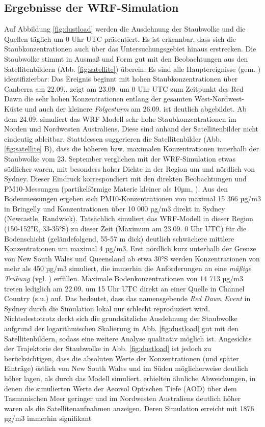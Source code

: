 \documentclass[12pt,a4paper,onecolumn]{scrartcl}
\begin{document}
\subsection{Ergebnisse der WRF-Simulation} \label{sec:wrf_results}
Auf Abbildung \ref{fig:dustload} werden die Ausdehnung der Staubwolke und die Quellen täglich um 0 Uhr UTC präsentiert. Es ist erkennbar, dass sich die Staubkonzentrationen auch über das Untersuchungsgebiet hinaus erstrecken. Die Staubwolke stimmt in Ausmaß und Form gut mit den Beobachtungen aus den Satellitenbildern (Abb. \ref{fig:satellite}) überein. Es sind alle Hauptereignisse (gem. \cite{Leys.2009}) identifizierbar: Das Ereignis beginnt mit hohen Staubkonzentrationen über Canberra am 22.09., zeigt am 23.09. um 0 Uhr UTC zum Zeitpunkt des Red Dawn die sehr hohen Konzentrationen entlang der gesamten West-Nordwest-Küste und auch der kleinere \textit{Folgesturm} am 26.09. ist deutlich abgebildet. Ab dem 24.09. simuliert das WRF-Modell sehr hohe Staubkonzentrationen im Norden und Nordwesten Australiens. Diese sind anhand der Satellitenbilder nicht eindeutig ableitbar. Stattdessen suggerieren die Satellitenbilder (Abb. \ref{fig:satellite} B), dass die höheren bzw. maximalen Konzentrationen innerhalb der Staubwolke vom 23. September verglichen mit der WRF-Simulation etwas südlicher waren, mit besonders hoher Dichte in der Region um und nördlich von Sydney. Dieser Eindruck korrespondiert mit den direkten Beobachtungen und PM10-Messungen (partikelförmige Materie kleiner als 10µm, \cite{Leys.2011}). Aus den Bodenmessungen ergeben sich PM10-Konzentrationen von maximal 15 366 µg/m3 in Bringelly und Konzentrationen über 10 000 µg/m3 direkt in Sydney (Newcastle, Randwick). Tatsächlich simuliert das WRF-Modell in dieser Region (150-152°E, 33-35°S) zu dieser Zeit (Maximum am 23.09. 0 Uhr UTC) für die Bodenschicht (geländefolgend, 55-57 m dick) deutlich schwächere mittlere Konzentrationen um maximal 4 µg/m3. Erst nördlich kurz unterhalb der Grenze von New South Wales und Queensland ab etwa 30°S werden Konzentrationen von mehr als 450 µg/m3 simuliert, die immerhin die Anforderungen an eine \textit{mäßige Trübung} (vgl. \cite{Leys.2011}) erfüllen. Maximale Bodenkonzentrationen von 14 713 µg/m3 treten lediglich am 22.09. um 15 Uhr UTC direkt an einer Quelle in Channel Country (s.u.) auf. Das bedeutet, dass das namensgebende \textit{Red Dawn Event} in Sydney durch die Simulation lokal nur schlecht reproduziert wird. Nichtsdestotrotz deckt sich die grundsätzliche Ausdehnung der Staubwolke aufgrund der logarithmischen Skalierung in Abb. \ref{fig:dustload} gut mit den Satellitenbildern, sodass eine weitere Analyse qualitativ möglich ist. Angesichts der Trajektorie der Staubwolke in Abb. \ref{fig:dustload} ist jedoch zu berücksichtigen, dass die absoluten Werte der Konzentrationen (und später Einträge) östlich von New South Wales und im Süden möglicherweise deutlich höher lagen, als durch das Modell simuliert. \citet{AlizadehChoobari.2012} erhielten ähnliche Abweichungen, in denen die simulierten Werte der Aeorsol Optischen Tiefe (AOD) über dem Tasmanischen Meer geringer und im Nordwesten Australiens deutlich höher waren als die Satellitenaufnahmen anzeigen. Deren Simulation erreicht mit 1876 µg/m3 immerhin signifikant 
\end{document}
